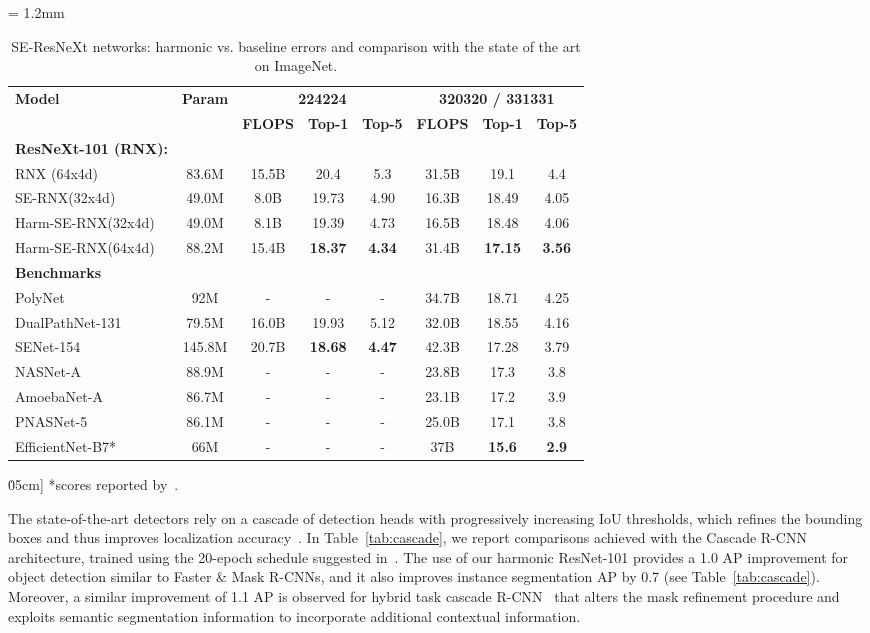 \documentclass[12pt,a4paper]{article}
\begin{document}
\begin{table}[h]
\caption{SE-ResNeXt networks: harmonic vs. baseline errors and comparison with the state of the art on ImageNet.} \label{tab:resnext}
\vspace{0.3\baselineskip}
\small
\centering
\tabcolsep = 1.2mm
\begin{tabular}{lccccccc}
 \hline
 \multirow{2}{*}{\textbf{Model}} & \multirow{2}{*}{\textbf{Param}} & \multicolumn{3}{c}{\textbf{224224}} & \multicolumn{3}{c}{\textbf{320320 / 331331}} \\
& & \textbf{FLOPS} & \textbf{Top-1} & \textbf{Top-5} & \textbf{FLOPS} & \textbf{Top-1} & \textbf{Top-5} \\
 \hline
 {\bf ResNeXt-101 (RNX):} \\
 RNX (64x4d)~\cite{Xie17} & 83.6M & 15.5B & 20.4 & 5.3 & 31.5B & 19.1 & 4.4 \\
 SE-RNX(32x4d) & 49.0M & 8.0B & 19.73 & 4.90 & 16.3B & 18.49 & 4.05 \\
 Harm-SE-RNX(32x4d) & 49.0M & 8.1B & 19.39 & 4.73 & 16.5B & 18.48 & 4.06 \\
 Harm-SE-RNX(64x4d) & 88.2M & 15.4B & \textbf{18.37} & \textbf{4.34} & 31.4B & \textbf{17.15} & \textbf{3.56} \\
 \hline
 {\bf Benchmarks}\\
 PolyNet~\cite{Hu19} & 92M & - & - & - & 34.7B & 18.71 & 4.25 \\
 DualPathNet-131~\cite{Hu19} & 79.5M & 16.0B & 19.93 & 5.12 & 32.0B & 18.55 & 4.16 \\
 SENet-154~\cite{Hu19} & 145.8M & 20.7B & \textbf{18.68} & \textbf{4.47} & 42.3B & 17.28 & 3.79 \\
 NASNet-A~\cite{Real19} & 88.9M & - & - & - & 23.8B & 17.3 & 3.8 \\
 AmoebaNet-A~\cite{Real19} & 86.7M & - & - & - & 23.1B & 17.2 & 3.9 \\
 PNASNet-5~\cite{Real19} & 86.1M & - & - & - & 25.0B & 17.1 & 3.8  \\
 EfficientNet-B7*~\cite{Tan19} & 66M & - & - & - & 37B & \textbf{15.6} & \textbf{2.9} \\
 \hline
\end{tabular}\.05cm]
*scores reported by~\cite{mmdet}.
\end{table}

The state-of-the-art detectors rely on a cascade of detection heads with progressively increasing IoU thresholds, which refines the bounding boxes and thus improves localization accuracy~\cite{Cai18}. In Table~\ref{tab:cascade},  we  report comparisons achieved with the Cascade R-CNN architecture, trained using the 20-epoch schedule suggested in~\cite{Cai18}. The use of our harmonic ResNet-101 provides a  1.0 AP improvement for object detection similar to Faster \& Mask R-CNNs, and it also improves instance segmentation AP by 0.7 (see Table~\ref{tab:cascade}). Moreover, a similar improvement of 1.1 AP is observed for   hybrid task cascade R-CNN~\cite{Chen19} that alters the mask refinement procedure and exploits semantic segmentation information to incorporate additional contextual information.
\end{document}
